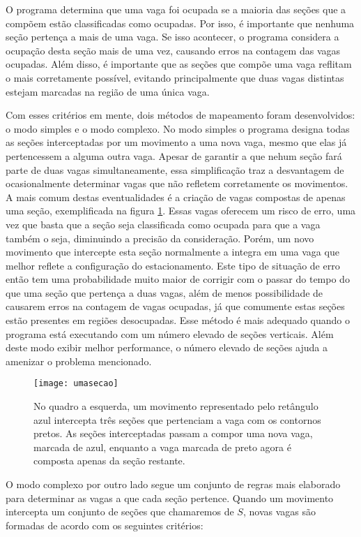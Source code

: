 O programa determina que uma vaga foi ocupada se a maioria das seções que a compõem estão classificadas como ocupadas. Por isso, é importante que nenhuma seção pertença a mais de uma vaga. Se isso acontecer, o programa considera a ocupação desta seção mais de uma vez, causando erros na contagem das vagas ocupadas. Além disso, é importante que as seções que compõe uma vaga reflitam o mais corretamente possível, evitando principalmente que duas vagas distintas estejam marcadas na região de uma única vaga. 

Com esses critérios em mente, dois métodos de mapeamento foram desenvolvidos: o modo simples e o modo complexo. No modo simples o programa designa todas as seções interceptadas por um movimento a uma nova vaga, mesmo que elas já pertencessem a alguma outra vaga. Apesar de garantir a que nehum seção fará parte de duas vagas simultaneamente, essa simplificação traz a desvantagem de ocasionalmente determinar vagas que não refletem corretamente os movimentos. A mais comum destas eventualidades é a criação de vagas compostas de apenas uma seção, exemplificada na figura \ref{fig:umasecao}. Essas vagas oferecem um risco de erro, uma vez que basta que a seção seja classificada como ocupada para que a vaga também o seja, diminuindo a precisão da consideração. Porém, um novo movimento que intercepte esta seção normalmente a integra em uma vaga que melhor reflete a configuração do estacionamento. Este tipo de situação de erro então tem uma probabilidade muito maior de corrigir com o passar do tempo do que uma seção que pertença a duas vagas, além de menos possibilidade de causarem erros na contagem de vagas ocupadas, já que comumente estas seções estão presentes em regiões desocupadas. Esse método é mais adequado quando o programa está executando com um número elevado de seções verticais. Além deste modo exibir melhor performance, o número elevado de seções ajuda a amenizar o problema mencionado.


\begin{figure}%
\centering
\texttt{[image: umasecao]}%
\caption{No quadro a esquerda, um movimento representado pelo retângulo azul intercepta três seções que pertenciam a vaga com os contornos pretos. As seções interceptadas passam a compor uma nova vaga, marcada de azul, enquanto a vaga marcada de preto agora é composta apenas da seção restante.}%
\label{fig:umasecao}%
\centering
\end{figure}

O modo complexo por outro lado segue um conjunto de regras mais elaborado para determinar as vagas a que cada seção pertence. Quando um movimento intercepta um conjunto de seções que chamaremos de $S$, novas vagas são formadas de acordo com os seguintes critérios:

